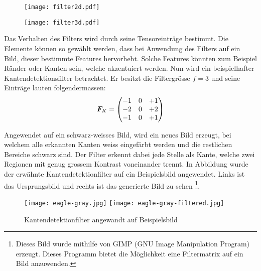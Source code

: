 \begin{figure}[h!]
  \centering
  \begin{minipage}{0.4\textwidth}
    \centering
    \texttt{[image: filter2d.pdf]}
    \label{fig:filter2d}
  \end{minipage}\hspace{1cm}%
  \begin{minipage}{0.5\textwidth}
    \centering
    \texttt{[image: filter3d.pdf]}
    \label{fig:filter3d}
  \end{minipage}
\end{figure}
\para{}
Das Verhalten des Filters wird durch seine Tensoreinträge bestimmt.
Die Elemente können so gewählt werden, dass bei Anwendung des Filters auf
ein Bild, dieser bestimmte Features hervorhebt. Solche Features
könnten zum Beispiel Ränder oder Kanten sein, welche akzentuiert werden.
\para{}
Nun wird ein beispielhafter Kantendetektionsfilter betrachtet. Er besitzt die
Filtergrösse $f=3$ und seine Einträge lauten folgendermassen:
\begin{equation*}
  \bm{F}_K =
  \begin{pmatrix}
    -1 & 0 & +1 \\
    -2 & 0 & +2 \\
    -1 & 0 & +1 \\
  \end{pmatrix}
\end{equation*}

Angewendet auf ein schwarz-weisses Bild, wird ein neues Bild erzeugt, bei welchem alle erkannten
Kanten weiss eingefärbt werden und die restlichen Bereiche schwarz sind.
Der Filter erkennt dabei jede Stelle als Kante, welche zwei Regionen mit
genug grossem Kontrast voneinander trennt.
In Abbildung  wurde der erwähnte Kantendetektionfilter auf ein
Beispielsbild angewendet. Links ist das Ursprungsbild und rechts ist das
generierte Bild zu sehen%
\footnote{
  Dieses Bild wurde mithilfe von GIMP (GNU Image Manipulation Program) erzeugt. Dieses
  Programm bietet die Möglichkeit eine Filtermatrix auf ein Bild anzuwenden.
}.

\begin{figure}[h!]
  \centering
  \texttt{[image: eagle-gray.jpg]}
  \texttt{[image: eagle-gray-filtered.jpg]}
  \caption{Kantendetektionfilter angewandt auf Beispielsbild \cite{res:eagle_image}}
  \label{fig:edge_filter}
\end{figure}

